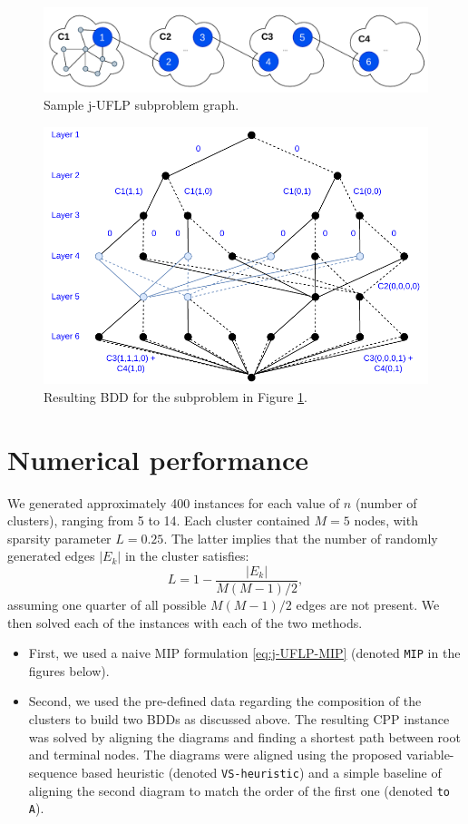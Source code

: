 \documentclass[11pt]{article}
\begin{document}
  \begin{figure}%
    \centering
    \includegraphics[width=\textwidth]{./caves.pdf}%
    \caption{Sample j-UFLP subproblem graph.}%
    \label{fig:caves}%
\end{figure}


  \begin{figure}%
    \centering
    \includegraphics[width=\textwidth]{./dcloud-DD.pdf}%
    \caption{Resulting BDD for the subproblem in Figure \ref{fig:caves}.}%
    \label{fig:dcloud-DD}%
\end{figure}

\section{Numerical performance}
\label{sec:org333aca4}
We generated approximately 400 instances for each value of \(n\) (number of
clusters), ranging from 5 to 14. Each cluster contained \(M=5\) nodes, with
sparsity parameter \(L=0.25\). The latter implies that the number of randomly
generated edges \(|E_k|\) in the cluster satisfies: $$L = 1 - \frac{|E_k|}{M(M-1)
/ 2},$$ assuming one quarter of all possible \(M(M-1)/2\) edges are not present.
We then solved each of the instances with each of the two methods.
\begin{itemize}
\item First, we used a naive MIP formulation \eqref{eq:j-UFLP-MIP} (denoted \texttt{MIP} in
the figures below).
\item Second, we used the pre-defined data regarding the composition of the clusters
to build two BDDs as discussed above. The resulting CPP instance was solved by
aligning the diagrams and finding a shortest path between root and terminal
nodes. The diagrams were aligned using the proposed variable-sequence based
heuristic (denoted \texttt{VS-heuristic}) and a simple baseline of aligning
the second diagram to match the order of the first one (denoted \texttt{to A}).
\end{itemize}
\end{document}
